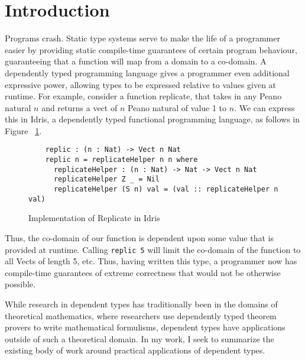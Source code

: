 \section{Introduction}
Programs crash. Static type systems serve to make the life of a programmer
easier by providing static compile-time guarantees of certain program behaviour,
guaranteeing that a function will map from a domain to a co-domain. A
dependently typed programming language gives a programmer even additional
expressive power, allowing types to be expressed relative to values given at
runtime. For example, consider a function replicate, that takes in any Peano
natural $n$ and returns a vect of $n$ Peano natural of value 1 to $n$. We can
express this in Idris, a dependently typed functional programming language, as
follows in Figure ~\ref{replicate_in_idris}. 

\begin{figure}[ht!]
  \caption{Implementation of Replicate in Idris}
  \label{replicate_in_idris}
  \begin{lstlisting}
    replic : (n : Nat) -> Vect n Nat
    replic n = replicateHelper n n where
      replicateHelper : (n : Nat) -> Nat -> Vect n Nat
      replicateHelper Z _ = Nil
      replicateHelper (S n) val = (val :: replicateHelper n val)
  \end{lstlisting}
\end{figure}

Thus, the co-domain of our function is dependent upon some value that is
provided at runtime. Calling \texttt{replic 5} will limit the co-domain of the
function to all Vects of length 5, etc. Thus, having written this type, a
programmer now has compile-time guarantees of extreme correctness that would not
be otherwise possible. 

While research in dependent types has traditionally been in the domains of
theoretical mathematics, where researchers use dependently typed theorem provers
to write mathematical formulisms, dependent types have applications outside of
such a theoretical domain. In my work, I seek to summarize the existing body of
work around practical applications of dependent types. 

